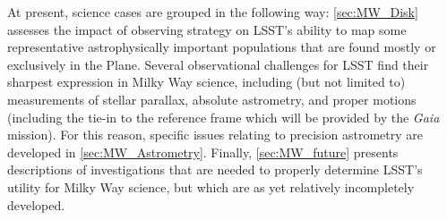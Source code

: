 At present, science cases are grouped in the following way:
\autoref{sec:MW_Disk} assesses the impact of observing strategy on
LSST's ability to map some representative astrophysically important
populations that are found mostly or exclusively in the Plane.
Several observational challenges for LSST find their
sharpest expression in Milky Way science, including (but not limited to)
measurements of stellar parallax, absolute astrometry, and proper
motions (including the tie-in to the reference frame which will be
provided by the \textit{Gaia} mission). For this reason, specific issues
relating to precision astrometry are developed in
\autoref{sec:MW_Astrometry}.
Finally, \autoref{sec:MW_future}
presents descriptions of investigations that are needed to properly
determine LSST's utility for Milky Way science, but which
are as yet relatively incompletely developed.

%

%

